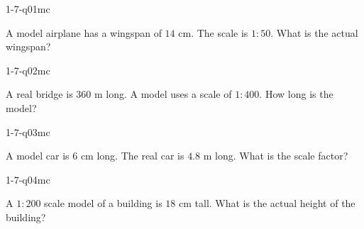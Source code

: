 

\begin{practiceQuestion}{1-7-q01}{mc}
\begin{questionText}
A model airplane has a wingspan of $14$ cm. The scale is $1 : 50$. What is the actual wingspan?
\end{questionText}
\end{practiceQuestion}

\begin{practiceQuestion}{1-7-q02}{mc}
\begin{questionText}
A real bridge is $360$ m long. A model uses a scale of $1 : 400$. How long is the model?
\end{questionText}
\end{practiceQuestion}

\begin{practiceQuestion}{1-7-q03}{mc}
\begin{questionText}
A model car is $6$ cm long. The real car is $4.8$ m long. What is the scale factor?
\end{questionText}
\end{practiceQuestion}

\begin{practiceQuestion}{1-7-q04}{mc}
\begin{questionText}
A $1 : 200$ scale model of a building is $18$ cm tall. What is the actual height of the building?
\end{questionText}
\end{practiceQuestion}

